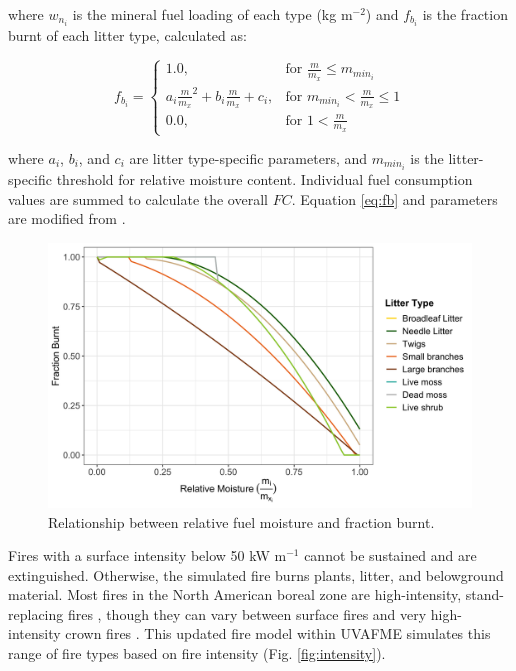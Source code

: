 \documentclass[a4paper, 12pt] {report}
\begin{document}
where $w_{n_i}$ is the mineral fuel loading of each type (kg m$^{-2}$) and $f_{b_i}$ is the fraction burnt of each litter type, calculated as:

\begin{equation} \label{eq:fb}
	f_{b_i} = 
	\begin{cases}
		1.0, & \text{for } \frac{m}{m_x} \leq m_{min_i}  \\
		a_i\frac{m}{m_x}^2 + b_i\frac{m}{m_x} + c_i, & \text{for } m_{min_i}  < \frac{m}{m_x}  \leq 1 \\
		0.0, & \text{for } 1 < \frac{m}{m_x} 
	\end{cases}
\end{equation}

where $a_i$, $b_i$, and $c_i$ are litter type-specific parameters, and $m_{min_i}$ is the litter-specific threshold for relative moisture content. Individual fuel consumption values are summed to calculate the overall $FC$. Equation \ref{eq:fb} and parameters are modified from .

\begin{figure}
	\includegraphics[width=\linewidth]{figures/frac_burnt.png}
	\caption{Relationship between relative fuel moisture and fraction burnt.}
\end{figure}

Fires with a surface intensity below 50 kW m$^{-1}$ cannot be sustained and are extinguished. Otherwise, the simulated fire burns plants, litter, and belowground material. Most fires in the North American boreal zone are high-intensity, stand-replacing fires \cite{rogersInfluenceTreeSpecies2015}, though they can vary between surface fires and very high-intensity crown fires \cite{vanwagnerFireBehaviorNorthern1983}. This updated fire model within UVAFME simulates this range of fire types based on fire intensity (Fig. \ref{fig:intensity}).
\end{document}
